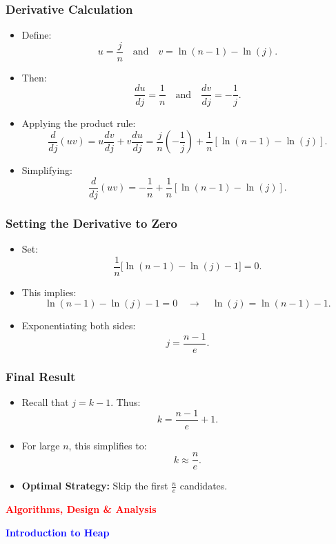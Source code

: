 \begin{frame}
    \frametitle{Derivative Calculation}
    \begin{itemize}
        \item Define:
        \[
        u = \frac{j}{n} \quad \text{and} \quad v = \ln(n-1)-\ln(j).
        \]
        \item Then:
        \[
        \frac{du}{dj} = \frac{1}{n} \quad \text{and} \quad \frac{dv}{dj} = -\frac{1}{j}.
        \]
        \item Applying the product rule:
        \[
        \frac{d}{dj}(uv) = u\frac{dv}{dj} + v\frac{du}{dj} 
        = \frac{j}{n}\left(-\frac{1}{j}\right) + \frac{1}{n}\left[\ln(n-1)-\ln(j)\right].
        \]
        \item Simplifying:
        \[
        \frac{d}{dj}(uv) = -\frac{1}{n} + \frac{1}{n}\left[\ln(n-1)-\ln(j)\right].
        \]
    \end{itemize}
\end{frame}

\begin{frame}
    \frametitle{Setting the Derivative to Zero}
    \begin{itemize}
        \item Set:
        \[
        \frac{1}{n}\Big[\ln(n-1)-\ln(j)-1\Big] = 0.
        \]
        \item This implies:
        \[
        \ln(n-1)-\ln(j)-1 = 0 \quad \rightarrow \quad \ln(j)=\ln(n-1)-1.
        \]
        \item Exponentiating both sides:
        \[
        j = \frac{n-1}{e}.
        \]
    \end{itemize}
\end{frame}

\begin{frame}
    \frametitle{Final Result}
    \begin{itemize}
        \item Recall that \(j = k-1\). Thus:
        \[
        k = \frac{n-1}{e} + 1.
        \]
        \item For large \(n\), this simplifies to:
        \[
        k \approx \frac{n}{e}.
        \]
        \item \textbf{Optimal Strategy:} Skip the first \(\frac{n}{e}\) candidates.
    \end{itemize}
\end{frame}

\begin{frame}
    \begin{center}
        \vspace*{1cm}  %
        {\Large \textcolor{red}{\textbf{Algorithms, Design \& Analysis}}}
        
        \vspace{0.5cm}  %
        \textcolor{blue}{\textbf{Introduction to Heap}}
        
        \vspace{1cm}  %
    \end{center}
\end{frame}

